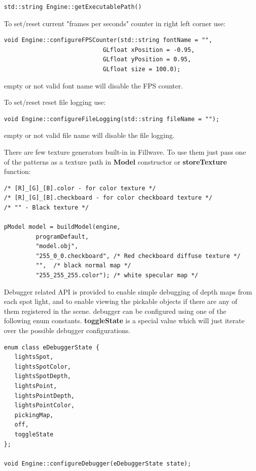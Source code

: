 \documentclass{article}
\begin{document}
\begin{lstlisting}
std::string Engine::getExecutablePath()
\end{lstlisting}

\indent To set/reset current "frames per seconds" counter in right left corner use:

\begin{lstlisting}
void Engine::configureFPSCounter(std::string fontName = "",
                            GLfloat xPosition = -0.95,
                            GLfloat yPosition = 0.95,
                            GLfloat size = 100.0);
\end{lstlisting}

empty or not valid font name will disable the FPS counter.

\indent To set/reset reset file logging use:

\begin{lstlisting}
void Engine::configureFileLogging(std::string fileName = "");
\end{lstlisting}

empty or not valid file name will disable the file logging.

\indent There are few texture generators built-in in Fillwave. To use them just pass one of the patterns as a texture path in \textbf{Model} constructor or \textbf{storeTexture} function:
\begin{lstlisting}
/* [R]_[G]_[B].color - for color texture */
/* [R]_[G]_[B].checkboard - for color checkboard texture */
/* "" - Black texture */

pModel model = buildModel(engine,
         programDefault,
         "model.obj",
         "255_0_0.checkboard", /* Red checkboard diffuse texture */
         "",  /* black normal map */
         "255_255_255.color"); /* white specular map */
\end{lstlisting}

\indent \indent Debugger related API is provided to enable simple debugging of depth maps from each spot light, and to enable viewing the pickable objects if there are any of them registered in the scene. debugger can be configured using one of the following enum constants. \textbf{toggleState} is a special value which will just iterate over the possible debugger configurations.

\begin{lstlisting}
enum class eDebuggerState {
   lightsSpot,
   lightsSpotColor,
   lightsSpotDepth,
   lightsPoint,
   lightsPointDepth,
   lightsPointColor,
   pickingMap,
   off,
   toggleState
};

void Engine::configureDebugger(eDebuggerState state);
\end{lstlisting}
\end{document}

